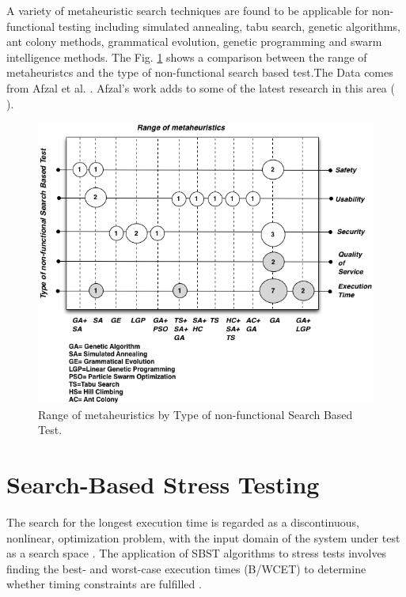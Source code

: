 A variety of metaheuristic search techniques are found to be applicable for non-functional testing including simulated annealing, tabu search, genetic algorithms, ant colony methods, grammatical evolution, genetic programming and swarm intelligence methods. The Fig. \ref{fig:metabykind} shows a comparison between the range of metaheuristcs and the type of non-functional search based test.The Data comes from Afzal et al. \cite{Afzal2009a}. Afzal's work adds to some of the latest research in this area (\cite{Garousi2006} \cite{Garousi2010} \cite{DiAlesio2013} \cite{DiAlesio2014} \cite{Alesio2015} \cite{Gois2016}). 


\begin{figure}[h]
\centering
\includegraphics[width=1\textwidth]{./images/metaheuristics.png}
\caption{Range of metaheuristics by Type of non-functional Search Based Test\cite{Afzal2009a}. }
\label{fig:metabykind}
\end{figure}




\section{Search-Based Stress Testing}

The search for the longest execution time is regarded as a discontinuous, nonlinear, optimization problem, with the input domain of the system under test as a search space \cite{Sullivan}.  The application of SBST algorithms to  stress tests involves finding the best- and worst-case execution times (B/WCET) to determine whether timing constraints are fulfilled \cite{Afzal2009a}. 

